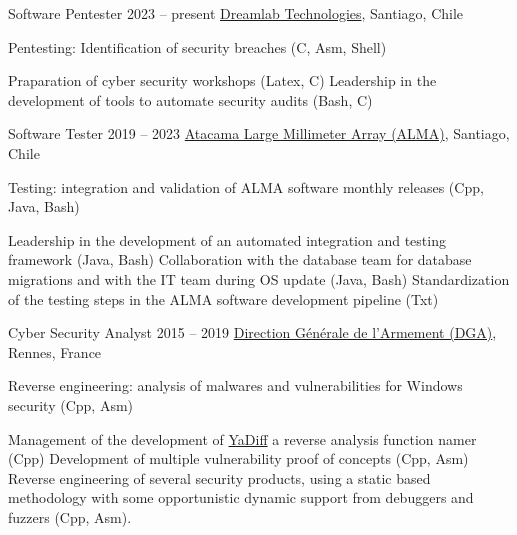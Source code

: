 \begin{joblist}[\tbfwidth][8.4][\tbfyeary]

\setlength{\parskip}{0.3cm}
\vspace{-0.4cm}

\item[Software Pentester]{2023 -- present}
  {
  \href{https://dreamlab.net}{Dreamlab Technologies}, Santiago, Chile
  }
  {Pentesting: Identification of security breaches (C, Asm, Shell)
    \vspace*{-0.2cm}
    \normalsize
    \begin{itemize}[leftmargin=*, label=\textbullet]
      \setlength\itemsep{-0.3cm}
      \cvitem Praparation of cyber security workshops (Latex, C)
      \cvitem Leadership in the development of tools to automate security audits (Bash, C)
    \end{itemize}
  }



\item[Software Tester]{2019 -- 2023}
  {
  \href{https://www.almaobservatory.org}{Atacama Large Millimeter Array (ALMA)}, Santiago, Chile
  }
  {Testing: integration and validation of ALMA software monthly releases (Cpp, Java, Bash)
    \vspace*{-0.2cm}
    \normalsize
    \begin{itemize}[leftmargin=*, label=\textbullet]
      \setlength\itemsep{-0.3cm}
      \cvitem Leadership in the development of an automated integration and testing framework (Java, Bash)
      \cvitem Collaboration with the database team for database migrations and with the IT team during OS update (Java, Bash)
      \cvitem Standardization of the testing steps in the ALMA software development pipeline (Txt)
    \end{itemize}
  }

\item[Cyber Security Analyst]{2015 -- 2019}
  {
  \href{http://www.defense.gouv.fr/dga/}{Direction Générale de l'Armement (DGA)}, Rennes, France
  }
  {Reverse engineering: analysis of malwares and vulnerabilities for Windows security (Cpp, Asm)
    \vspace*{-0.2cm}
    \normalsize
    \begin{itemize}[leftmargin=*, label=\textbullet]
      \setlength\itemsep{-0.3cm}
      \cvitem Management of the development of \href{https://github.com/DGA-MI-SSI/YaCo}{YaDiff} a reverse analysis function namer (Cpp)
      \cvitem Development of multiple vulnerability proof of concepts (Cpp, Asm)
      \cvitem Reverse engineering of several security products, using a static based methodology with some opportunistic dynamic support from debuggers and fuzzers (Cpp, Asm).
    \end{itemize}
  }


\end{joblist}
